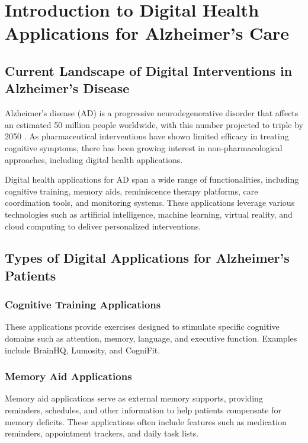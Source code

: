 \chapter{Introduction to Digital Health Applications for Alzheimer's Care}

\section{Current Landscape of Digital Interventions in Alzheimer's Disease}
Alzheimer's disease (AD) is a progressive neurodegenerative disorder that affects an estimated 50 million people worldwide, with this number projected to triple by 2050 \cite{WHO2020}. As pharmaceutical interventions have shown limited efficacy in treating cognitive symptoms, there has been growing interest in non-pharmacological approaches, including digital health applications.

Digital health applications for AD span a wide range of functionalities, including cognitive training, memory aids, reminiscence therapy platforms, care coordination tools, and monitoring systems. These applications leverage various technologies such as artificial intelligence, machine learning, virtual reality, and cloud computing to deliver personalized interventions.

\section{Types of Digital Applications for Alzheimer's Patients}
\subsection{Cognitive Training Applications}
These applications provide exercises designed to stimulate specific cognitive domains such as attention, memory, language, and executive function. Examples include BrainHQ, Lumosity, and CogniFit.

\subsection{Memory Aid Applications}
Memory aid applications serve as external memory supports, providing reminders, schedules, and other information to help patients compensate for memory deficits. These applications often include features such as medication reminders, appointment trackers, and daily task lists.

